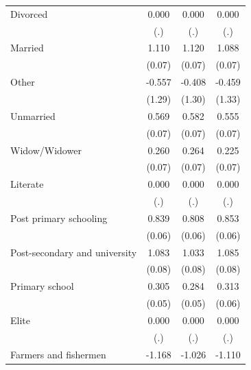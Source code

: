{\begin{tabular}{l*{3}{c}}
Divorced            &       0.000         &       0.000         &       0.000         \\
                    &         (.)         &         (.)         &         (.)         \\
Married             &       1.110\sym{***}&       1.120\sym{***}&       1.088\sym{***}\\
                    &      (0.07)         &      (0.07)         &      (0.07)         \\
Other               &      -0.557         &      -0.408         &      -0.459         \\
                    &      (1.29)         &      (1.30)         &      (1.33)         \\
Unmarried           &       0.569\sym{***}&       0.582\sym{***}&       0.555\sym{***}\\
                    &      (0.07)         &      (0.07)         &      (0.07)         \\
Widow/Widower       &       0.260\sym{***}&       0.264\sym{***}&       0.225\sym{**} \\
                    &      (0.07)         &      (0.07)         &      (0.07)         \\
Literate            &       0.000         &       0.000         &       0.000         \\
                    &         (.)         &         (.)         &         (.)         \\
Post primary schooling&       0.839\sym{***}&       0.808\sym{***}&       0.853\sym{***}\\
                    &      (0.06)         &      (0.06)         &      (0.06)         \\
Post-secondary and university&       1.083\sym{***}&       1.033\sym{***}&       1.085\sym{***}\\
                    &      (0.08)         &      (0.08)         &      (0.08)         \\
Primary school      &       0.305\sym{***}&       0.284\sym{***}&       0.313\sym{***}\\
                    &      (0.05)         &      (0.05)         &      (0.06)         \\
Elite               &       0.000         &       0.000         &       0.000         \\
                    &         (.)         &         (.)         &         (.)         \\
Farmers and fishermen&      -1.168\sym{***}&      -1.026\sym{***}&      -1.110\sym{***}\\

\end{tabular}}
